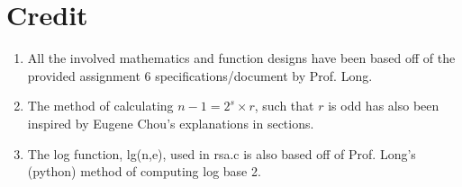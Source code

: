 \documentclass[
	12pt, %
]{fphw}
\begin{document}
\section{Credit}

\begin{enumerate}
	\item All the involved mathematics and function designs have been based off of the provided assignment 6 specifications/document by Prof. Long.
	\item The method of calculating $n - 1 = 2^s \times r$, such that $r$ is odd has also been inspired by Eugene Chou's explanations in sections.
	\item The log function, lg(n,e), used in rsa.c is also based off of Prof. Long's (python) method of computing log base 2.
\end{enumerate}


\end{document}
